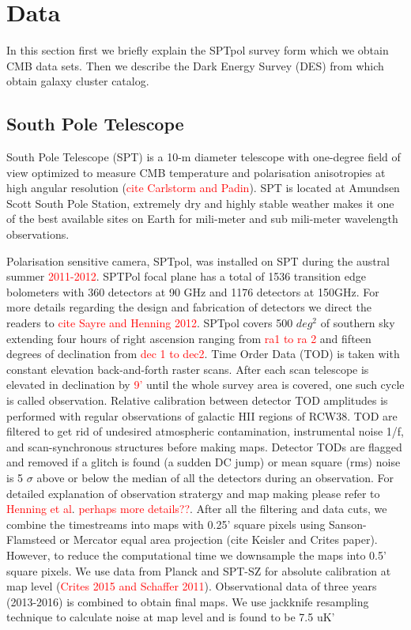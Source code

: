 \documentclass[usenatbib, twocolumn, nofootinbib, reprint]{aastex61}
\newcommand{\pending}[1]{\textcolor{red}{#1}}
\begin{document}
\section{Data}
In this section first we briefly explain the SPTpol survey form which we obtain CMB data sets.
Then we describe the Dark Energy Survey (DES) from which obtain galaxy cluster catalog.


\subsection{South Pole Telescope}
South Pole Telescope (SPT) is a 10-m diameter telescope with one-degree field of view optimized to measure CMB temperature and polarisation anisotropies at high angular resolution (\pending{cite Carlstorm and Padin}). SPT is located at Amundsen Scott South Pole Station, extremely dry and highly stable weather makes it one of the best available sites on Earth for mili-meter and sub mili-meter wavelength observations. 

Polarisation sensitive camera, SPTpol, was installed on SPT during the austral summer \pending{2011-2012}. SPTPol focal plane has a total of 1536 transition edge bolometers with 360 detectors at 90 GHz and 1176 detectors at 150GHz. For more details regarding the design and fabrication of detectors we direct the readers to \pending{cite Sayre and Henning 2012}. 
SPTpol covers 500 $deg^{2}$ of southern sky extending four hours of right ascension ranging from \pending{ra1 to ra 2} and fifteen degrees of declination from \pending {dec 1 to dec2}.  
Time Order Data (TOD) is taken with constant elevation back-and-forth raster scans. 
After each scan telescope is elevated in declination by \pending{9'} until the whole survey area is covered, one such cycle is called observation.
Relative calibration between detector TOD amplitudes is performed with regular observations of galactic HII regions of RCW38.
TOD are filtered to get rid of undesired atmospheric contamination, instrumental noise 1/f, and scan-synchronous structures before making maps. 
Detector TODs are flagged and removed if a glitch is found (a sudden DC jump) or mean square (rms) noise is 5 $\sigma$ above or below the median of all the detectors during an observation.  
For detailed explanation of observation stratergy and map making please refer to \pending{Henning et al}. \pending{perhaps more details??}.
After all the filtering and data cuts, we combine the timestreams into maps with 0.25' square pixels using Sanson-Flamsteed or Mercator equal area projection (cite Keisler and Crites paper). 
However, to reduce the computational time we downsample the maps into 0.5' square pixels.  
We use data from Planck and SPT-SZ for absolute calibration at map level (\pending{Crites 2015 and Schaffer 2011}).
Observational data of three years (2013-2016) is combined to obtain final maps. 
We use jackknife resampling technique to calculate noise at map level and is found to be 7.5 uK' 
\end{document}
